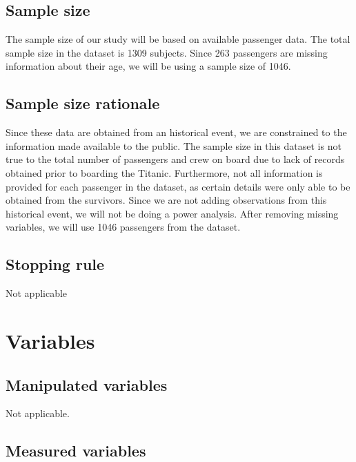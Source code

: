 \documentclass[]{article}
\begin{document}
\hypertarget{sample-size}{%
\subsection{Sample size}\label{sample-size}}

The sample size of our study will be based on available passenger data.
The total sample size in the dataset is 1309 subjects. Since 263
passengers are missing information about their age, we will be using a
sample size of 1046.

\hypertarget{sample-size-rationale}{%
\subsection{Sample size rationale}\label{sample-size-rationale}}

Since these data are obtained from an historical event, we are
constrained to the information made available to the public. The sample
size in this dataset is not true to the total number of passengers and
crew on board due to lack of records obtained prior to boarding the
Titanic. Furthermore, not all information is provided for each passenger
in the dataset, as certain details were only able to be obtained from
the survivors. Since we are not adding observations from this historical
event, we will not be doing a power analysis. After removing missing
variables, we will use 1046 passengers from the dataset.

\hypertarget{stopping-rule}{%
\subsection{Stopping rule}\label{stopping-rule}}

Not applicable

\hypertarget{variables}{%
\section{Variables}\label{variables}}

\hypertarget{manipulated-variables}{%
\subsection{Manipulated variables}\label{manipulated-variables}}

Not applicable.

\hypertarget{measured-variables}{%
\subsection{Measured variables}\label{measured-variables}}
\end{document}
